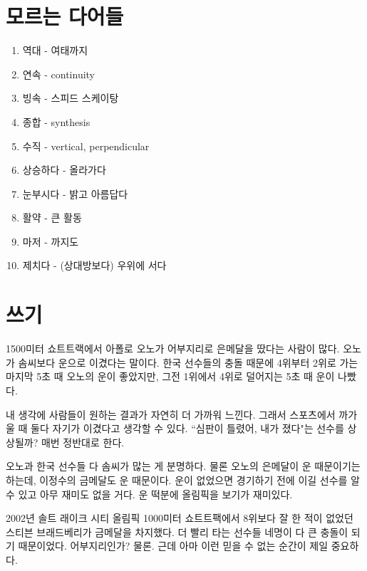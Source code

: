 \documentclass[11pt]{article}
\begin{document}
\section{모르는 다어들}
\begin{enumerate}
  \item 역대 - 여태까지
  \item 연속 - continuity
  \item 빙속 - 스피드 스케이탕
  \item 종합 - synthesis
  \item 수직 - vertical, perpendicular
  \item 상승하다 - 올라가다
  \item 눈부시다 - 밝고 아름답다
  \item 활약 - 큰 활동
  \item 마저 - 까지도
  \item 제치다 - (상대방보다) 우위에 서다 
\end{enumerate}

\section{쓰기}
\doublespacing
1500미터 쇼트트랙에서 아폴로 오노가 어부지리로 은메달을 땄다는 사람이 많다.  오노가 솜씨보다 운으로 이겼다는 말이다. 한국 선수들의 충돌 때문에 4위부터 2위로 가는 마지막 5초 때 오노의 운이 좋았지만, 그전 1위에서 4위로 덜어지는 5초 때 운이 나빴다. 

내 생각에 사람들이 원하는 결과가 자연히 더 가까워 느낀다. 그래서 스포츠에서 까가울 때 둘다 자기가 이겼다고 생각할 수 있다.  ``심판이 틀렸어, 내가 졌다"는 선수를 상상될까? 매번 정반대로 한다.

오노과 한국 선수들 다 솜씨가 많는 게 분명하다. 물론 오노의 은메달이 운 때문이기는 하는데, 이정수의 금메달도 운 때문이다. 운이 없었으면 경기하기 전에 이길 선수를 알 수 있고 아무 재미도 없을 거다. 운 떡분에 올림픽을 보기가 재미있다.

2002년 솔트 래이크 시티 올림픽 1000미터 쇼트트팩에서 8위보다 잘 한 적이 없었던 스티븐 브래드베리가 금메달을 차지했다. 더 빨리 타는 선수들 네명이 다 큰 충돌이 되기 때문이었다. 어부지리인가? 물론. 근데 아마 이런 믿을 수 없는 순간이 제일 중요하다.
\end{document}
